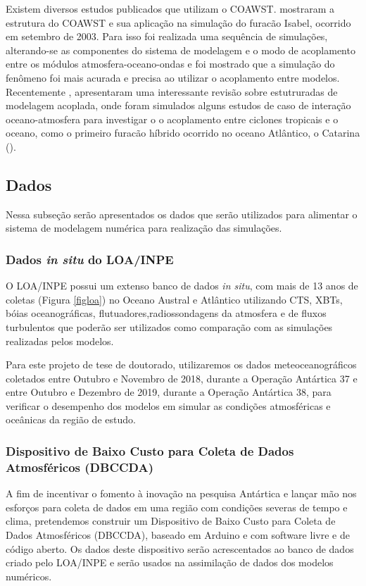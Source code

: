 \documentclass{article}
\begin{document}
Existem diversos estudos publicados que utilizam o COAWST. \textcite{Warner2008} mostraram a estrutura do COAWST e sua aplicação na simulação do 
furacão Isabel, ocorrido  em  setembro  de  2003. Para isso foi realizada  uma sequência de simulações, alterando-se as componentes do 
sistema de modelagem e o modo de acoplamento entre os módulos atmosfera-oceano-ondas e foi mostrado que a simulação do fenômeno foi mais acurada e precisa ao
utilizar o acoplamento entre modelos. Recentemente \cite{Pullen2018}, apresentaram uma interessante revisão sobre estutruradas de modelagem acoplada, onde foram simulados
alguns estudos de caso de interação oceano-atmosfera para investigar o o acoplamento entre ciclones tropicais e o oceano, como o primeiro furacão híbrido
ocorrido no oceano Atlântico, o Catarina (\cite{McTaggart2006}).


\subsection{Dados}
\bigskip

Nessa subseção serão apresentados os dados que serão utilizados para alimentar o sistema de modelagem numérica para realização das simulações.

\subsubsection{Dados \textit{in situ} do LOA/INPE}
\bigskip

O LOA/INPE possui um extenso banco de dados \textit{in situ}, com mais de 13 anos de coletas (\textcolor{bleu_cite}{Figura \ref{figloa}}) no Oceano Austral e
Atlântico utilizando CTS, XBTs, bóias oceanográficas, flutuadores,radiossondagens da atmosfera e de fluxos turbulentos que poderão ser utilizados 
como comparação com as simulações realizadas pelos modelos. 

Para este projeto de tese de doutorado, utilizaremos os dados meteoceanográficos coletados entre Outubro e Novembro de 2018, durante a Operação Antártica 37 
e entre Outubro e Dezembro de 2019, durante a Operação Antártica 38, para verificar o desempenho dos modelos em simular as condições atmosféricas e oceânicas 
da região de estudo.


\subsubsection{Dispositivo de Baixo Custo para Coleta de Dados Atmosféricos (DBCCDA)}
\bigskip
A fim de incentivar o fomento à inovação na pesquisa Antártica e lançar mão nos esforços para coleta de dados em uma região com condições severas
de tempo e clima, pretendemos construir um Dispositivo de Baixo Custo para Coleta de Dados Atmosféricos (DBCCDA), baseado em Arduino e com software livre e de 
código aberto. Os dados deste dispositivo serão acrescentados ao banco de dados criado pelo LOA/INPE e serão usados na assimilação de dados dos 
modelos numéricos.
\bigskip
\end{document}
